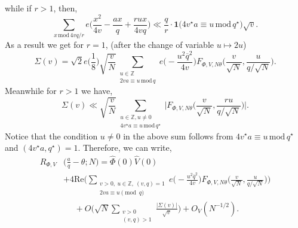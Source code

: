 \documentclass[12pt,reqno]{amsart}
\theoremstyle{plain}
\numberwithin{equation}{section}
\numberwithin{figure}{section}
\theoremstyle{plain}
\theoremstyle{definition}
\theoremstyle{remark}
\newcommand{\mmod}{\,\mathrm{mod}\,}
\begin{document}
while if $r > 1$, then, 
$$
\sum_{x \mmod{4v q / r}} 
e \Big ( \frac{x^2}{4 v} - \frac{a x}{q} 
+ \frac{r u x}{4 v q}  \Big ) \ll \frac{q}{r} \cdot \mathbf{1} \Big ( 4 v^{\star} a \equiv u \mmod{q^{\star}} \Big ) \sqrt{v}.
$$
As a result we get for $r = 1$, (after the change of variable $u \mapsto 2 u$)
\begin{equation} \label{eq:slavez}
\Sigma(v) = \sqrt{2} e \Big ( \frac 18 \Big )\sqrt{\frac{v}{N}}
 \sum_{\substack{u \in \mathbb{Z}
 \\ 2 v a \equiv u \mmod{q}}} 
 e \Big ( - \frac{u^2 \overline{q}^2}{4 v}  \Big ) 
 F_{\Phi, V, N \theta} 
 \Big ( \frac{v}{\sqrt{N}}, \frac{u}{q / \sqrt{N}} \Big ).
\end{equation}
Meanwhile for $r  > 1$ we have, 
$$
\Sigma(v) \ll \sqrt{\frac{v}{N}} \sum_{\substack{u \in \mathbb{Z}, u \neq 0 \\ 4 v^{\star} a \equiv u \mmod{q^{\star}}}} \Big | F_{\Phi, V, N \theta} \Big ( \frac{v}{\sqrt{N}}, \frac{r u}{q / \sqrt{N}} \Big ) \Big |. 
$$
Notice that the condition $u \neq 0$ in the above sum follows from $4 v^{\star} a \equiv u \mmod{q^{\star}}$ and $(4 v^{\star} a, q^{\star}) = 1$.
Therefore, we can write, 
\begin{align*}
R_{\Phi, V} & \Big ( \frac{a}{q} - \theta; N \Big ) = \widehat{\Phi}(0) \widehat{V}(0) \\ & + 4 \mathrm{Re} \Big ( \sum_{\substack{v > 0,\ u \in \mathbb{Z}, \ (v, q) = 1 \\ 2 v a \equiv u \pmod{q}}} e \Big ( - \frac{u^2 \overline{q}^2}{4 v} \Big ) F_{\Phi, V, N \theta} \Big ( \frac{v}{\sqrt{N}}, \frac{u}{q / \sqrt{N}} \Big )\Big ) \\ & \ \ \ \ \ \ + O \Big ( \sqrt{N} \sum_{\substack{v > 0 \\ (v,q) > 1}} \frac{|\Sigma(v)|}{\sqrt{v}} \Big ) + O_V(N^{-1/2}).
\end{align*}
\end{document}
